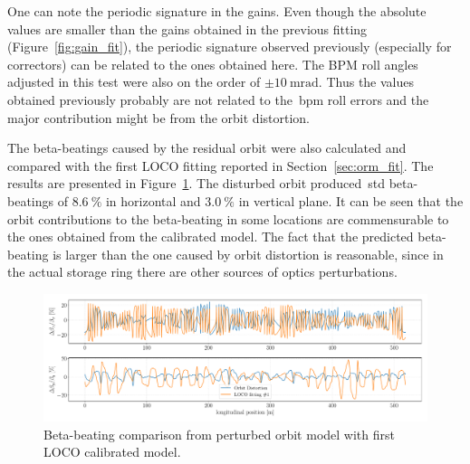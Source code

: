 One can note the periodic signature in the gains. Even though the absolute values are smaller than the gains obtained in the previous fitting (Figure~\ref{fig:gain_fit}), the periodic signature observed previously (especially for correctors) can be related to the ones obtained here. The BPM roll angles adjusted in this test were also on the order of $\pm\SI{10}{\milli\radian}$. Thus the values obtained previously probably are not related to the~\gls{bpm} roll errors and the major contribution might be from the orbit distortion.

The beta-beatings caused by the residual orbit were also calculated and compared with the first LOCO fitting reported in Section~\ref{sec:orm_fit}. The results are presented in Figure~\ref{fig:beta_beating_orb}. The disturbed orbit produced~\gls{std} beta-beatings of $\SI{8.6}{\%}$ in horizontal and $\SI{3.0}{\%}$ in vertical plane. It can be seen that the orbit contributions to the beta-beating in some locations are commensurable to the ones obtained from the calibrated model. The fact that the predicted beta-beating is larger than the one caused by orbit distortion is reasonable, since in the actual storage ring there are other sources of optics perturbations. 
\begin{figure}
\centering
\includegraphics[width=1.0\textwidth]{figures/beta_beating_orbit_loco_iter0.pdf}
\caption{Beta-beating comparison from perturbed orbit model with first LOCO calibrated model.}
\label{fig:beta_beating_orb}
\end{figure}

